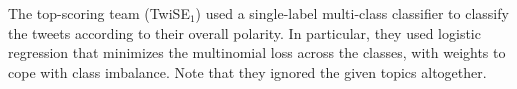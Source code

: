 \documentclass[11pt,letterpaper]{article}
\begin{document}
The top-scoring team (TwiSE$_{1}$) used a single-label multi-class classifier
to classify the tweets according to their overall polarity. 
In particular, they used logistic regression that minimizes the multinomial loss across the classes, with weights to cope with class imbalance. Note that they ignored the given topics altogether.


\renewcommand{\baselinestretch}{0.78}
\end{document}
